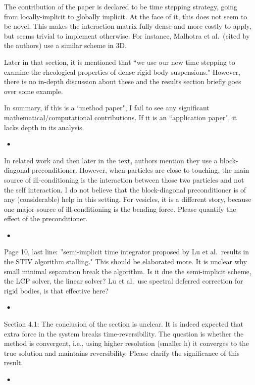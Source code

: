 \documentclass[11pt]{article}
\newcommand{\comment}[1]{{\color{blue} #1}}
\begin{document}
\noindent
\comment{The contribution of the paper is declared to be time stepping
  strategy, going from locally-implicit to globally implicit. At the
  face of it, this does not seem to be novel. This makes the interaction
  matrix fully dense and more costly to apply, but seems trivial to
  implement otherwise. For instance, Malhotra et al.~(cited by the
authors) use a similar scheme in 3D.

Later in that section, it is mentioned that ``we use our new time
stepping to examine the rheological properties of dense rigid body
suspensions." However, there is no in-depth discussion about these and
the results section briefly goes over some example.

In summary, if this is a ``method paper", I fail to see any significant
mathematical/computational contributions. If it is an ``application
paper", it lacks depth in its analysis.}
\begin{itemize}
  \item
\end{itemize}

\noindent
\comment{In related work and then later in the text, authors mention
  they use a block-diagonal preconditioner. However, when particles are
  close to touching, the main source of ill-conditioning is the
  interaction between those two particles and not the self interaction.
  I do not believe that the block-diagonal preconditioner is of any
  (considerable) help in this setting.  For vesicles, it is a different
  story, because one major source of ill-conditioning is the bending
force.  Please quantify the effect of the preconditioner.}
\begin{itemize}
  \item
\end{itemize}

\noindent
\comment{Page 10, last line: ''semi-implicit time integrator proposed by
  Lu et al.~results in the STIV algorithm stalling." This should be
  elaborated more.  It is unclear why small minimal separation break the
  algorithm.  Is it due the semi-implicit scheme, the LCP solver, the
linear solver?  Lu et al.~use spectral deferred correction for rigid
bodies, is that effective here?}
\begin{itemize}
  \item
\end{itemize}

\noindent
\comment{Section 4.1: The conclusion of the section is unclear.  It is
  indeed expected that extra force in the system breaks
  time-reversibility.  The question is whether the method is convergent,
  i.e., using higher resolution (smaller h) it converges to the true
  solution and maintains reversibility.  Please clarify the significance
of this result.}
\begin{itemize}
  \item
\end{itemize}
\end{document}
